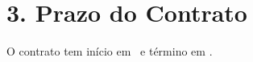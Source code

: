 \section*{3. Prazo do Contrato}
O contrato tem início em \Rentstartdate\ e término em \Rentenddate.
